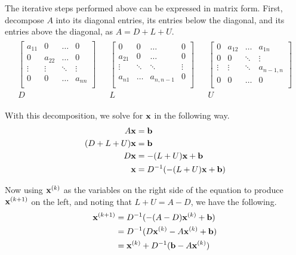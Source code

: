 The iterative steps performed above can be expressed in matrix form.
First, decompose $A$ into its diagonal entries, its entries below the diagonal, and its entries above the diagonal, as $A = D + L + U$.
\begin{align*}
\begin{array}{ccccc}
    \left[\begin{array}{cccc}
        a_{11} & 0 & \ldots & 0 \\
        0 & a_{22} & \ldots & 0 \\
        \vdots & \vdots & \ddots & \vdots \\
        0 & 0 & \ldots & a_{nn} \\
    \end{array}\right]
    & &
    \left[\begin{array}{cccc}
    0 & 0 & \ldots & 0 \\
    a_{21} &  0 & \ldots & 0\\
     \vdots & \ddots & \ddots & \vdots \\
    a_{n1} & \ldots & a_{n,n-1} & 0 \\
    \end{array}\right]
    & &
    \left[\begin{array}{cccc}
    0 & a_{12} & \ldots & a_{1n} \\
    0 & 0 & \ddots & \vdots \\
     \vdots & \vdots & \ddots & a_{n-1,n} \\
    0 & 0 & \ldots & 0 \\
    \end{array}\right]
    \\D & & L & & U
\end{array}
\end{align*}

With this decomposition, we solve for $\mathbf{x}$ in the following way.
\begin{align*}
A\mathbf{x} &= \mathbf{b}\\
(D + L + U)\mathbf{x} &= \mathbf{b}\\
D\mathbf{x} &= -(L+U)\mathbf{x} + \mathbf{b}\\
\mathbf{x} &= D^{-1}(-(L+U)\mathbf{x} + \mathbf{b})
\end{align*}

Now using $\mathbf{x}^{(k)}$ as the variables on the right side of the equation to produce $\mathbf{x}^{(k+1)}$ on the left, and noting that $L+U=A-D$, we have the following.
\begin{align}
\nonumber \mathbf{x}^{(k+1)} &= D^{-1}(-(A-D)\mathbf{x}^{(k)} + \mathbf{b}) \\
\nonumber &= D^{-1}(D\mathbf{x}^{(k)} - A\mathbf{x}^{(k)}  + \mathbf{b})\\
&= \mathbf{x}^{(k)} + D^{-1}(\mathbf{b} - A\mathbf{x}^{(k)})
\label{eq:jacobi-method}
\end{align}

